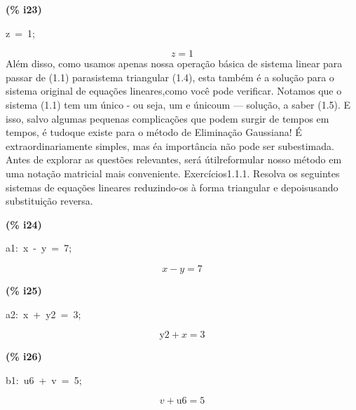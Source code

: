 \documentclass[fleqn]{article}
\begin{document}
\noindent
\begin{minipage}[t]{4.000000em}\color{red}\bfseries
(\% i23)	
\end{minipage}
\begin{minipage}[t]{\textwidth}\color{blue}
z\ =\ 1;
\end{minipage}
\[\displaystyle \tag{\% o23} 
z\mathop{=}1\mbox{}
\]
Além disso, como usamos apenas nossa operação básica de sistema linear para passar de (1.1) parasistema triangular (1.4), esta também é a solução para o sistema original de equações lineares,como você pode verificar. Notamos que o sistema (1.1) tem um único - ou seja, um e únicoum — solução, a saber (1.5).
E isso, salvo algumas pequenas complicações que podem surgir de tempos em tempos, é tudoque existe para o método de Eliminação Gaussiana! É extraordinariamente simples, mas éa importância não pode ser subestimada. Antes de explorar as questões relevantes, será útilreformular nosso método em uma notação matricial mais conveniente.
Exercícios1.1.1. Resolva os seguintes sistemas de equações lineares reduzindo-os à forma triangular e depoisusando substituição reversa.


\noindent
\begin{minipage}[t]{4.000000em}\color{red}\bfseries
(\% i24)	
\end{minipage}
\begin{minipage}[t]{\textwidth}\color{blue}
a1:\ x\ -\ y\ =\ 7;
\end{minipage}
\[\displaystyle \tag{a1} 
x\mathop{-}y\mathop{=}7\mbox{}
\]


\noindent
\begin{minipage}[t]{4.000000em}\color{red}\bfseries
(\% i25)	
\end{minipage}
\begin{minipage}[t]{\textwidth}\color{blue}
a2:\ x\ +\ y2\ =\ 3;
\end{minipage}
\[\displaystyle \tag{a2} 
\ensuremath{\mathrm{y2}}\mathop{+}x\mathop{=}3\mbox{}
\]


\noindent
\begin{minipage}[t]{4.000000em}\color{red}\bfseries
(\% i26)	
\end{minipage}
\begin{minipage}[t]{\textwidth}\color{blue}
b1:\ u6\ +\ v\ =\ 5;
\end{minipage}
\[\displaystyle \tag{b1} 
v\mathop{+}\ensuremath{\mathrm{u6}}\mathop{=}5\mbox{}
\]
\end{document}
